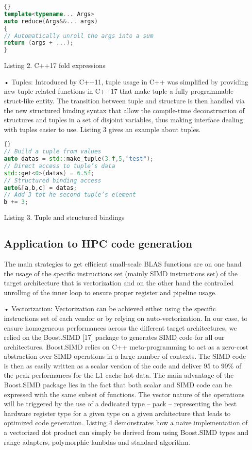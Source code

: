 \documentclass[../../main.tex]{subfiles}
\begin{document}
\begin{lstlisting}[language=c++]{}
template<typename... Args>
auto reduce(Args&&... args)
{
// Automatically unroll the args into a sum
return (args + ...);
}
\end{lstlisting}
Listing 2. C++17 fold expressions

• Tuples: Introduced by C++11, tuple usage in C++ was
simplified by providing new tuple related functions in
C++17 that make tuple a fully programmable struct-like
entity. The transition between tuple and structure is then
handled via the new structured binding syntax that allow
the compile-time deconstruction of structures and tuples
in a set of disjoint variables, thus making interface
dealing with tuples easier to use. Listing 3 gives an
example about tuples.

\begin{lstlisting}[language=c++]{}
// Build a tuple from values
auto datas = std::make_tuple(3.f,5,"test");
// Direct access to tuple’s data
std::get<0>(datas) = 6.5f;
// Structured binding access
auto&[a,b,c] = datas;
// Add 3 tot he second tuple’s element
b += 3;
\end{lstlisting}
Listing 3. Tuple and structured bindings

\subsection{Application to HPC code generation}

The main strategies to get efficient small-scale BLAS
functions are on one hand the usage of the specific
instructions set (mainly SIMD instructions set) of the target
architecture that is vectorization and on the other hand the
controlled unrolling of the inner loop to ensure proper register
and pipeline usage.

• Vectorization: Vectorization can be achieved either
using the specific instructions set of each vendor or
by relying on auto-vectorization. In our case, to ensure
homogeneous performances across the different target
architectures, we relied on the Boost.SIMD [17] package
to generates SIMD code for all our architectures.
Boost.SIMD relies on C++ meta-programming to act as
a zero-cost abstraction over SIMD operations in a large
number of contexts. The SIMD code is then as easily
written as a scalar version of the code and deliver 95%
to 99\% of the peak performances for the L1 cache hot
data. The main advantage of the Boost.SIMD package
lies in the fact that both scalar and SIMD code can
be expressed with the same subset of functions. The
vector nature of the operations will be triggered by
the use of a dedicated type – pack – representing the
best hardware register type for a given type on a given
architecture that leads to optimized code generation.
Listing 4 demonstrates how a naive implementation of a
vectorized dot product can simply be derived from using
Boost.SIMD types and range adapters, polymorphic
lambdas and standard algorithm.
\end{document}
